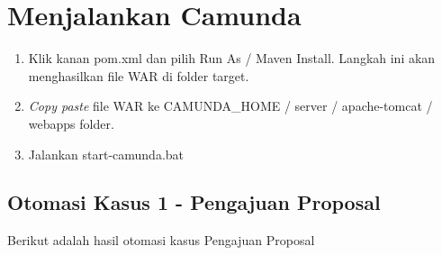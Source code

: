 \section{Menjalankan Camunda}
\label{hasilstudi_menjalankancamunda}
	\begin{enumerate}
		\item Klik kanan pom.xml dan pilih Run As / Maven Install. Langkah ini akan menghasilkan file WAR di folder target.
		\item \textit{Copy paste} file WAR ke CAMUNDA\_HOME / server / apache-tomcat / webapps folder.
		\item Jalankan start-camunda.bat
	\end{enumerate}
	
	
\subsection{Otomasi Kasus 1 - Pengajuan Proposal}
\label{menjalankancamunda_kasus1}	
Berikut adalah hasil otomasi kasus Pengajuan Proposal
